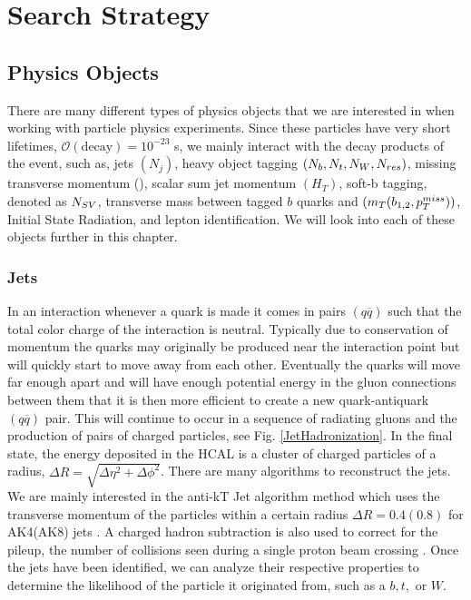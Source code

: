 \chapter{Search Strategy}
\label{ch:SearchStrategy}

\section{Physics Objects}\label{PhysObj}
There are many different types of physics objects that we are interested in when working with particle physics experiments. Since these particles have very short lifetimes, $\mathcal{O}(\text{decay})=10^{-23}$ s, we mainly interact with the decay products of the event, such as, jets $(N_j)$, heavy object tagging $(N_{b}, N_{t}, N_{W}, N_{res})$, missing transverse momentum (\met), scalar sum jet momentum $(H_T)$, soft-b tagging, denoted as $N_{SV}$, transverse mass between tagged $b$ quarks and \met{} $(m_T(b_{1,2}, p_{T}^{miss}))$, Initial State Radiation, and lepton identification. We will look into each of these objects further in this chapter.

\subsection{Jets}\label{Jets}
In an interaction whenever a quark is made it comes in pairs $(q\overline{q})$ such that the total color charge of the interaction is neutral. Typically due to conservation of momentum the quarks may originally be produced near the interaction point but will quickly start to move away from each other. Eventually the quarks will move far enough apart and will have enough potential energy in the gluon connections between them that it is then more efficient to create a new quark-antiquark $(q\overline{q})$ pair. This will continue to occur in a sequence of radiating gluons and the production of pairs of charged particles, see Fig. \ref{JetHadronization}. In the final state, the energy deposited in the HCAL is a cluster of charged particles of a radius, $\Delta R=\sqrt{\Delta\eta^2+\Delta\phi^2}$. There are many algorithms to reconstruct the jets. We are mainly interested in the anti-kT Jet algorithm \cite{cacciari_anti-ktjet_2008} method which uses the transverse momentum of the particles within a certain radius $\Delta R = 0.4 (0.8)$ for AK4(AK8) jets \cite{noauthor_https://twiki.cern.ch/twiki/bin/view/cms/jetid_nodate, noauthor_https://twiki.cern.ch/twiki/bin/view/cms/introtojec_nodate}. A charged hadron subtraction is also used to correct for the pileup, the number of collisions seen during a single proton beam crossing \cite{noauthor_pileup_2014}. Once the jets have been identified, we can analyze their respective properties to determine the likelihood of the particle it originated from, such as a $b, t, \text{ or } W$. 

